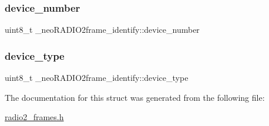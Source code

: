 \subsubsection{\texorpdfstring{device\+\_\+number}{device\_number}}
{\footnotesize\ttfamily uint8\+\_\+t \+\_\+neo\+R\+A\+D\+I\+O2frame\+\_\+identify\+::device\+\_\+number}

\mbox{\label{struct__neo_r_a_d_i_o2frame__identify_ae0c891394ecf630614023803d56fb915}} 
\subsubsection{\texorpdfstring{device\+\_\+type}{device\_type}}
{\footnotesize\ttfamily uint8\+\_\+t \+\_\+neo\+R\+A\+D\+I\+O2frame\+\_\+identify\+::device\+\_\+type}



The documentation for this struct was generated from the following file\+:\begin{DoxyCompactItemize}
\item 
\mbox{\hyperlink{radio2__frames_8h}{radio2\+\_\+frames.\+h}}\end{DoxyCompactItemize}
